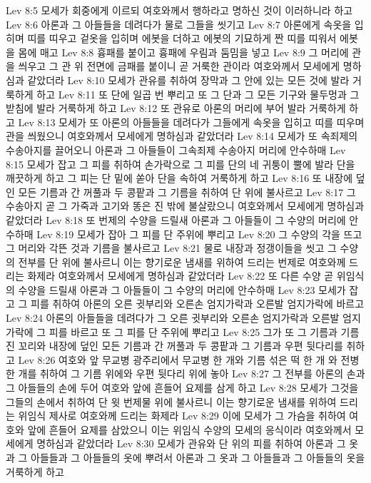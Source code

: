 Lev 8:5  모세가 회중에게 이르되 여호와께서 행하라고 명하신 것이 이러하니라 하고
Lev 8:6  아론과 그 아들들을 데려다가 물로 그들을 씻기고
Lev 8:7  아론에게 속옷을 입히며 띠를 띠우고 겉옷을 입히며 에봇을 더하고 에봇의 기묘하게 짠 띠를 띠워서 에봇을 몸에 매고
Lev 8:8  흉패를 붙이고 흉패에 우림과 둠밈을 넣고
Lev 8:9  그 머리에 관을 씌우고 그 관 위 전면에 금패를 붙이니 곧 거룩한 관이라 여호와께서 모세에게 명하심과 같았더라
Lev 8:10  모세가 관유를 취하여 장막과 그 안에 있는 모든 것에 발라 거룩하게 하고
Lev 8:11  또 단에 일곱 번 뿌리고 또 그 단과 그 모든 기구와 물두멍과 그 받침에 발라 거룩하게 하고
Lev 8:12  또 관유로 아론의 머리에 부어 발라 거룩하게 하고
Lev 8:13  모세가 또 아론의 아들들을 데려다가 그들에게 속옷을 입히고 띠를 띠우며 관을 씌웠으니 여호와께서 모세에게 명하심과 같았더라
Lev 8:14  모세가 또 속죄제의 수송아지를 끌어오니 아론과 그 아들들이 그속죄제 수송아지 머리에 안수하매
Lev 8:15  모세가 잡고 그 피를 취하여 손가락으로 그 피를 단의 네 귀퉁이 뿔에 발라 단을 깨끗하게 하고 그 피는 단 밑에 쏟아 단을 속하여 거룩하게 하고
Lev 8:16  또 내장에 덮인 모든 기름과 간 꺼풀과 두 콩팥과 그 기름을 취하여 단 위에 불사르고
Lev 8:17  그 수송아지 곧 그 가죽과 고기와 똥은 진 밖에 불살랐으니 여호와께서 모세에게 명하심과 같았더라
Lev 8:18  또 번제의 수양을 드릴새 아론과 그 아들들이 그 수양의 머리에 안수하매
Lev 8:19  모세가 잡아 그 피를 단 주위에 뿌리고
Lev 8:20  그 수양의 각을 뜨고 그 머리와 각뜬 것과 기름을 불사르고
Lev 8:21  물로 내장과 정갱이들을 씻고 그 수양의 전부를 단 위에 불사르니 이는 향기로운 냄새를 위하여 드리는 번제로 여호와께 드리는 화제라 여호와께서 모세에게 명하심과 같았더라
Lev 8:22  또 다른 수양 곧 위임식의 수양을 드릴새 아론과 그 아들들이 그 수양의 머리에 안수하매
Lev 8:23  모세가 잡고 그 피를 취하여 아론의 오른 귓부리와 오른손 엄지가락과 오른발 엄지가락에 바르고
Lev 8:24  아론의 아들들을 데려다가 그 오른 귓부리와 오른손 엄지가락과 오른발 엄지가락에 그 피를 바르고 또 그 피를 단 주위에 뿌리고
Lev 8:25  그가 또 그 기름과 기름진 꼬리와 내장에 덮인 모든 기름과 간 꺼풀과 두 콩팥과 그 기름과 우편 뒷다리를 취하고
Lev 8:26  여호와 앞 무교병 광주리에서 무교병 한 개와 기름 섞은 떡 한 개 와 전병 한 개를 취하여 그 기름 위에와 우편 뒷다리 위에 놓아
Lev 8:27  그 전부를 아론의 손과 그 아들들의 손에 두어 여호와 앞에 흔들어 요제를 삼게 하고
Lev 8:28  모세가 그것을 그들의 손에서 취하여 단 윗 번제물 위에 불사르니 이는 향기로운 냄새를 위하여 드리는 위임식 제사로 여호와께 드리는 화제라
Lev 8:29  이에 모세가 그 가슴을 취하여 여호와 앞에 흔들어 요제를 삼았으니 이는 위임식 수양의 모세의 응식이라 여호와께서 모세에게 명하심과 같았더라
Lev 8:30  모세가 관유와 단 위의 피를 취하여 아론과 그 옷과 그 아들들과 그 아들들의 옷에 뿌려서 아론과 그 옷과 그 아들들과 그 아들들의 옷을 거룩하게 하고
